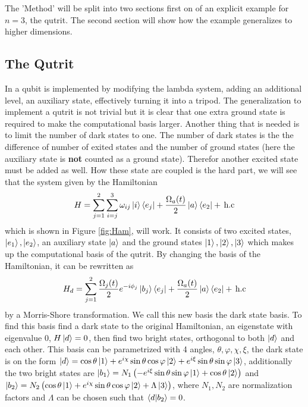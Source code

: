 
The 'Method' will be split into two sections first on of an explicit example for $n = 3$, the qutrit. The second section will show how the example generalizes to higher dimensions.


\subsection{The Qutrit}
In \cite{darkpath} a qubit is implemented by modifying the lambda system, adding an additional level, an auxiliary state, effectively turning it into a tripod. 
The generalization to implement a qutrit is not trivial but it is clear that one extra ground state is required to make the computational basis larger. Another thing that is needed is to limit the number of dark states to one. The number of dark states is the the difference of number of exited states and the number of ground states\cite{lambda} (here the auxiliary state is \textbf{not} counted as a ground state). Therefor another excited state must be added as well. How these state are coupled is the hard part, we will see that the system given by the Hamiltonian
\begin{equation}
\label{eq:Ham}
H = \sum_{j = 1}^2 \sum_{i =j}^{3} \omega_{ij}\ket{i}\bra{e_j}  + \frac{\Omega_{a}(t)}{2}\ket{a}\bra{e_2}  +\,\text{h.c}
\end{equation}
which is shown in Figure \ref{fig:Ham}, will work.  It consists of two excited states, $\ket{e_1}, \ket{e_2}$, an auxiliary state $\ket{a}$ and the ground states $\ket{1}, \ket{2}, \ket{3}$ which 
makes up the computational basis of the qutrit. By changing the basis of the Hamiltonian, it can be rewritten as 
\begin{equation}
\label{eq:Hamd}
H_d = \sum_{j = 1}^2 \frac{\Omega_j(t)}{2}e^{-i\phi_j}\ket{b_j}\bra{e_j}  + \frac{\Omega_a(t)}{2}\ket{a}\bra{e_2}  +\,\text{h.c}
\end{equation} 
by a Morris-Shore transformation\cite{morris}. We call this new basis the dark state basis. To find this basis find a dark state to the original  Hamiltonian, an eigenstate with eigenvalue $0$, $H\ket{d} = 0$, then find two bright states, orthogonal to both $\ket{d}$ and each other. This basis can be parametrized with 4 angles, $\theta, \varphi, \chi, \xi$, the dark state is on the form $\ket{d} = \cos\theta\ket{1} + e^{i\chi}\sin\theta\cos\varphi\ket{2} + e^{i\xi}\sin\theta\sin\varphi\ket{3}$, additionally the two bright states are $\ket{b_1} = N_1 \left(-e^{i\xi}\sin\theta\sin\varphi\ket{1} + \cos\theta\ket{2} \right)$ and $\ket{b_2} = N_2 \left(\cos\theta\ket{1} +  e^{i\chi}\sin\theta\cos\varphi\ket{2} + \Lambda \ket{3}\right ) $, where $N_1, N_2$ are normalization factors and $\Lambda$ can be chosen such that $\bra{d}\ket{b_2} = 0$.

